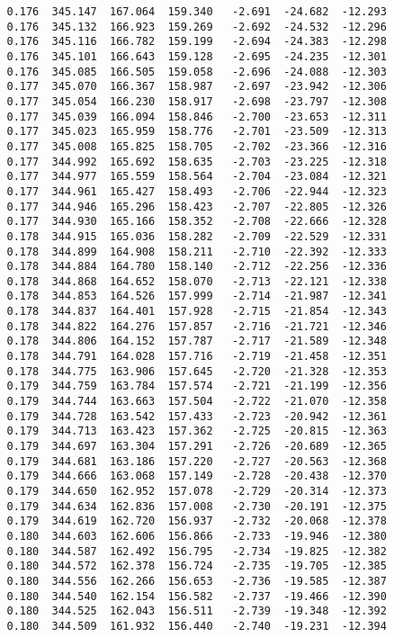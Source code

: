 \begin{verbatim}
   0.176  345.147  167.064  159.340   -2.691  -24.682  -12.293
   0.176  345.132  166.923  159.269   -2.692  -24.532  -12.296
   0.176  345.116  166.782  159.199   -2.694  -24.383  -12.298
   0.176  345.101  166.643  159.128   -2.695  -24.235  -12.301
   0.176  345.085  166.505  159.058   -2.696  -24.088  -12.303
   0.177  345.070  166.367  158.987   -2.697  -23.942  -12.306
   0.177  345.054  166.230  158.917   -2.698  -23.797  -12.308
   0.177  345.039  166.094  158.846   -2.700  -23.653  -12.311
   0.177  345.023  165.959  158.776   -2.701  -23.509  -12.313
   0.177  345.008  165.825  158.705   -2.702  -23.366  -12.316
   0.177  344.992  165.692  158.635   -2.703  -23.225  -12.318
   0.177  344.977  165.559  158.564   -2.704  -23.084  -12.321
   0.177  344.961  165.427  158.493   -2.706  -22.944  -12.323
   0.177  344.946  165.296  158.423   -2.707  -22.805  -12.326
   0.177  344.930  165.166  158.352   -2.708  -22.666  -12.328
   0.178  344.915  165.036  158.282   -2.709  -22.529  -12.331
   0.178  344.899  164.908  158.211   -2.710  -22.392  -12.333
   0.178  344.884  164.780  158.140   -2.712  -22.256  -12.336
   0.178  344.868  164.652  158.070   -2.713  -22.121  -12.338
   0.178  344.853  164.526  157.999   -2.714  -21.987  -12.341
   0.178  344.837  164.401  157.928   -2.715  -21.854  -12.343
   0.178  344.822  164.276  157.857   -2.716  -21.721  -12.346
   0.178  344.806  164.152  157.787   -2.717  -21.589  -12.348
   0.178  344.791  164.028  157.716   -2.719  -21.458  -12.351
   0.178  344.775  163.906  157.645   -2.720  -21.328  -12.353
   0.179  344.759  163.784  157.574   -2.721  -21.199  -12.356
   0.179  344.744  163.663  157.504   -2.722  -21.070  -12.358
   0.179  344.728  163.542  157.433   -2.723  -20.942  -12.361
   0.179  344.713  163.423  157.362   -2.725  -20.815  -12.363
   0.179  344.697  163.304  157.291   -2.726  -20.689  -12.365
   0.179  344.681  163.186  157.220   -2.727  -20.563  -12.368
   0.179  344.666  163.068  157.149   -2.728  -20.438  -12.370
   0.179  344.650  162.952  157.078   -2.729  -20.314  -12.373
   0.179  344.634  162.836  157.008   -2.730  -20.191  -12.375
   0.179  344.619  162.720  156.937   -2.732  -20.068  -12.378
   0.180  344.603  162.606  156.866   -2.733  -19.946  -12.380
   0.180  344.587  162.492  156.795   -2.734  -19.825  -12.382
   0.180  344.572  162.378  156.724   -2.735  -19.705  -12.385
   0.180  344.556  162.266  156.653   -2.736  -19.585  -12.387
   0.180  344.540  162.154  156.582   -2.737  -19.466  -12.390
   0.180  344.525  162.043  156.511   -2.739  -19.348  -12.392
   0.180  344.509  161.932  156.440   -2.740  -19.231  -12.394

\end{verbatim}
